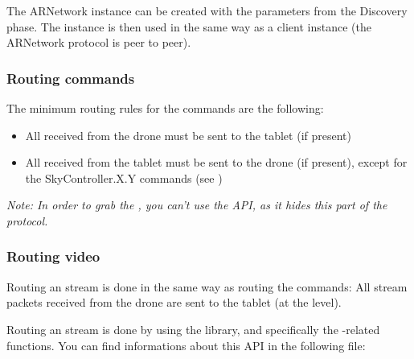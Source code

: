 The ARNetwork instance can be created with the parameters from the Discovery phase. The instance is then used in the same way as a client instance (the ARNetwork protocol is peer to peer).

\subsubsection{Routing commands}

The minimum routing rules for the commands are the following:

\begin{itemize}
\item All  received from the drone must be sent to the tablet (if present)
\item All  received from the tablet must be sent to the drone (if present), except for the SkyController.X.Y commands (see )
\end{itemize}

\emph{Note: In order to grab the , you can't use the  API, as it hides this part of the protocol.}

\subsubsection{Routing video}

Routing an  stream is done in the same way as routing the commands: All stream packets received from the drone are sent to the tablet (at the  level).

Routing an  stream is done by using the  library, and specifically the -related functions. You can find informations about this API in the following file:\\


